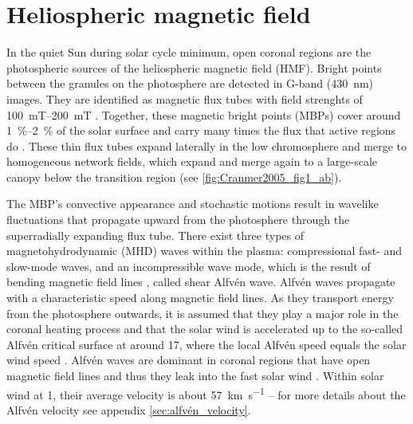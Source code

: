 \section{Heliospheric magnetic field}
\label{sec:heliospheric_magnetic_field}
In the quiet Sun during solar cycle minimum, open coronal regions are the photospheric sources of the heliospheric magnetic field (HMF). Bright points between the granules on the photosphere are detected in G-band (\SI{430}{\nano\meter}) images. They are identified as magnetic flux tubes with field strenghts of \SIrange{100}{200}{\milli\tesla} \citep{Cranmer2005}. Together, these magnetic bright points (MBPs) cover around \SIrange{1}{2}{\%} of the solar surface and carry many times the flux that active regions do \citep{Sanchez_Almeida2010}. These thin flux tubes expand laterally in the low chromosphere and merge to homogeneous network fields, which expand and merge again to a large-scale canopy below the transition region (see \autoref{fig:Cranmer2005_fig1_ab}).
\begin{figure}[htb]
\end{figure}

The MBP's convective appearance and stochastic motions result in wavelike fluctuations that propagate upward from the photosphere through the superradially expanding flux tube. There exist three types of magnetohydrodynamic (MHD) waves within the plasma: compressional fast- and slow-mode waves, and an incompressible wave mode, which is the result of bending magnetic field lines \citep{Alfven1942}, called shear Alfvén wave. Alfvén waves propagate with a characteristic speed along magnetic field lines. As they transport energy from the photosphere outwards, it is assumed that they play a major role in the coronal heating process and that the solar wind is accelerated up to the so-called Alfvén critical surface at around \SI{17}{\Rs}, where the local Alfvén speed equals the solar wind speed \citep{Sittler1999,Exarhos2000}. Alfvén waves are dominant in coronal regions that have open magnetic field lines and thus they leak into the fast solar wind \citep{Cranmer2005}. Within solar wind at \SI{1}{\au}, their average velocity is about \SI{57}{\km\per\s} \citep{Veselovsky2010} -- for more details about the Alfvén velocity see appendix \autoref{sec:alfvén_velocity}.

